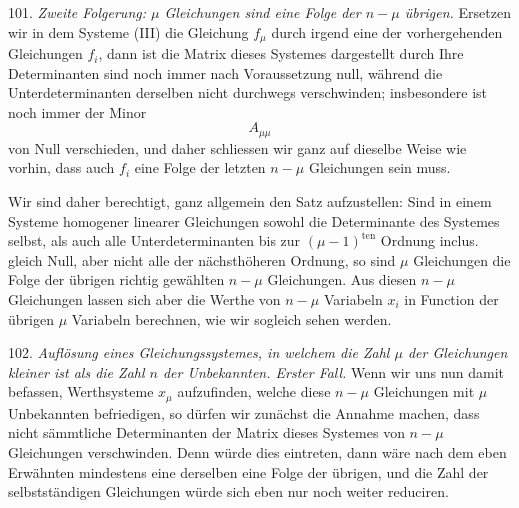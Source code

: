 101. \textit{Zweite Folgerung: $\mu$ Gleichungen sind eine Folge der
$n - \mu$ \"ubrigen.} Ersetzen wir in dem Systeme (III) die Gleichung
$f_\mu$ durch irgend eine der vorhergehenden Gleichungen $f_i$, dann ist
die Matrix dieses Systemes dargestellt durch
Ihre Determinanten sind noch immer nach Voraussetzung null, w\"ahrend die
Unterdeterminanten derselben nicht durchwegs verschwinden; insbesondere
ist noch immer der Minor
\[
A_{\mu\mu}
\]
von Null verschieden, und daher schliessen wir ganz auf dieselbe Weise
wie vorhin, dass auch $f_i$ eine Folge der letzten $n - \mu$ Gleichungen
sein muss.

Wir sind daher berechtigt, ganz allgemein den Satz aufzustellen:
\glqq Sind in einem Systeme homogener linearer Gleichungen sowohl die
Determinante des Systemes selbst, als auch alle Unterdeterminanten bis
zur $(\mu - 1)^{\mathrm{ten}}$ Ordnung inclus. gleich Null, aber nicht
alle der n\"achsth\"oheren Ordnung, so sind $\mu$ Gleichungen die Folge
der \"ubrigen richtig gew\"ahlten $n - \mu$ Gleichungen.\grqq{}
Aus diesen $n - \mu$ Gleichungen lassen sich aber die Werthe von
$n - \mu$ Variabeln $x_i$ in Function der \"ubrigen $\mu$ Variabeln
berechnen, wie wir sogleich sehen werden.

102. \textit{Aufl\"osung eines Gleichungssystemes, in welchem die Zahl
$\mu$ der Gleichungen kleiner ist als die Zahl $n$ der Unbekannten. Erster
Fall.} Wenn wir uns nun damit befassen, Werthsysteme $x_\mu$ aufzufinden,
welche diese $n - \mu$ Gleichungen mit $\mu$ Unbekannten befriedigen, so
d\"urfen wir zun\"achst die Annahme machen, dass nicht s\"ammtliche
Determinanten der Matrix dieses Systemes von $n - \mu$ Gleichungen
verschwinden. Denn w\"urde dies eintreten, dann w\"are nach dem eben
Erw\"ahnten mindestens eine derselben eine Folge der \"ubrigen, und die
Zahl der selbstst\"andigen Gleichungen w\"urde sich eben nur noch weiter
reduciren.

